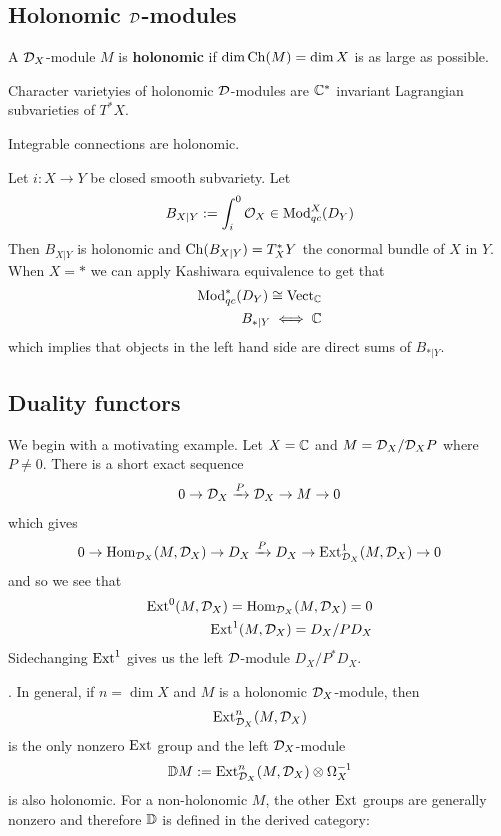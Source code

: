 \subsection{Holonomic ${\mathcal{D}}$-modules}
\begin{definition}
	A ${\mathcal{D}}_X$-module $M$ is \textbf{holonomic} if $\dim \operatorname{Ch}(M) = \dim X$ is as large as possible.
\end{definition}
Character varietyies of holonomic ${\mathcal{D}}$-modules are $\mathbb{C}^*$ invariant Lagrangian subvarieties of $T^*X$.
\begin{example}
	Integrable connections are holonomic.
\end{example}
\begin{example}
	Let $i:X\to Y$ be closed smooth subvariety. Let \begin{align*}
		B_{X\vert Y} := \int_i^0 {\mathcal{O}}_X \in \operatorname{Mod}^X_{qc}(D_Y)
	\end{align*}
	Then $B_{X\vert Y}$ is holonomic and $\operatorname{Ch}(B_{X\vert Y}) = T^*_XY$ the conormal bundle of $X$ in $Y$.
	When $X = *$ we can apply Kashiwara equivalence to get that \begin{align*}
		\operatorname{Mod}_{qc}^*(D_Y) \cong \operatorname{Vect}_{\mathbb{C}} \\
		B_{*\vert Y} \iff \mathbb{C}
	\end{align*} which implies that objects in the left hand side are direct sums of $B_{*\vert Y}$.
\end{example}

\subsection{Duality functors}
We begin with a motivating example. Let $X = \mathbb{C}$
and $M = {\mathcal{D}}_X/{\mathcal{D}}_XP$ where $P\neq 0$. There is a short exact sequence \begin{align*}
	0 \to {\mathcal{D}}_X \xrightarrow{P} {\mathcal{D}}_X \to M \to 0
\end{align*} which gives \begin{align*}
	0 \to \operatorname{Hom}_{{\mathcal{D}}_X}(M,{\mathcal{D}}_X) \to D_X \xrightarrow{P} D_X \to \operatorname{Ext}^1_{{\mathcal{D}}_X}(M,{\mathcal{D}}_X) \to 0
\end{align*} and so we see that \begin{align*}
	\operatorname{Ext}^0(M,{\mathcal{D}}_X) = \operatorname{Hom}_{{\mathcal{D}}_X}(M,{\mathcal{D}}_X) = 0 \\
	\operatorname{Ext}^1(M,{\mathcal{D}}_X) = D_X/PD_X
\end{align*} Sidechanging $\operatorname{Ext}^1$ gives us the left ${\mathcal{D}}$-module $D_X/P^*D_X$.

. In general,
if $n = \dim X$ and $M$ is a holonomic ${\mathcal{D}}_X$-module, then \begin{align*}
	\operatorname{Ext}^n_{{\mathcal{D}}_X}(M,{\mathcal{D}}_X)
\end{align*} is the only nonzero $\operatorname{Ext}$ group and the left ${\mathcal{D}}_X$-module \begin{align*}
	\mathbb{D} M := \operatorname{Ext}^n_{{\mathcal{D}}_X}(M,{\mathcal{D}}_X) \otimes \Omega_X^{-1}
\end{align*} is also holonomic. For a non-holonomic $M$, the other $\operatorname{Ext}$ groups are generally nonzero
and therefore $\mathbb{D}$ is defined in the derived category:

